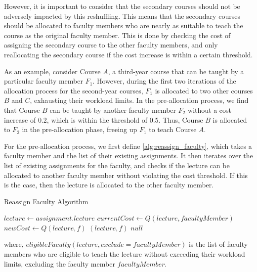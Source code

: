 However, it is important to consider that the secondary courses should not be adversely impacted by this reshuffling. This means that the secondary courses should be allocated to faculty members who are nearly as suitable to teach the course as the original faculty member. This is done by checking the cost of assigning the secondary course to the other faculty members, and only reallocating the secondary course if the cost increase is within a certain threshold.

As an example, consider Course $A$, a third-year course that can be taught by a particular faculty member $F_1$. However, during the first two iterations of the allocation process for the second-year courses, $F_1$ is allocated to two other courses $B$ and $C$, exhausting their workload limits. In the pre-allocation process, we find that Course $B$ can be taught by another faculty member $F_2$ without a cost increase of 0.2, which is within the threshold of 0.5. Thus, Course $B$ is allocated to $F_2$ in the pre-allocation phase, freeing up $F_1$ to teach Course $A$.

For the pre-allocation process, we first define \autoref{alg:reassign_faculty}, which takes a faculty member and the list of their existing assignments. It then iterates over the list of existing assignments for the faculty, and checks if the lecture can be allocated to another faculty member without violating the cost threshold. If this is the case, then the lecture is allocated to the other faculty member.

\begin{algorithm}[H]
  \caption{Reassign Faculty Algorithm}
  \begin{algorithmic}[1]
    \State $lecture \gets assignment.lecture$
    \State $currentCost \gets Q(lecture, facultyMember)$
    \State $newCost \gets Q(lecture, f)$
    \Return $(lecture, f)$
    \EndIf
    \EndFor
    \EndFor
    \State \Return $null$
    \EndProcedure
  \end{algorithmic}
  \label{alg:reassign_faculty}
\end{algorithm}

where, $eligibleFaculty(lecture, exclude=facultyMember)$ is the list of faculty members who are eligible to teach the lecture without exceeding their workload limits, excluding the faculty member $facultyMember$.

